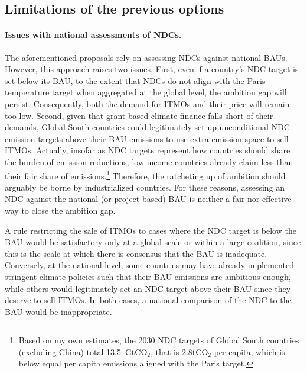 \documentclass[12pt,english]{article}
\begin{document}
\subsection{Limitations of the previous options\label{subsec:limitations}}

\paragraph{Issues with national assessments of NDCs.}
The aforementioned proposals %
rely on assessing NDCs against national BAUs. However, this approach raises two issues. 
First, even if a country's NDC target is set below its BAU, to the extent that NDCs do not align with the Paris temperature target when aggregated at the global level, the ambition gap will persist. %
Consequently, both the demand for ITMOs and their price will remain too low. Second, given that %
grant-based climate finance falls short of their demands, Global South countries could legitimately set up unconditional NDC emission targets above their BAU emissions to use extra emission space to sell ITMOs. Actually, insofar as NDC targets represent how countries should share the burden of emission reductions, low-income countries already claim less than their fair share of emissions.\footnote{Based on my own estimates, the 2030 NDC targets of Global South countries (excluding China) total 13.5~GtCO$_\text{2}$, that is 2.8tCO$_\text{2}$ per capita, which is below equal per capita emissions aligned with the Paris target.} %
Therefore, the ratcheting up of ambition should arguably be borne by industrialized countries. For these reasons, assessing an NDC against the national (or project-based) BAU is neither a fair nor effective way to close the ambition gap. %

A rule restricting the sale of ITMOs to cases where the NDC target is below the BAU would be satisfactory only at a global scale or within a large coalition, since this is the scale at which there is consensus that the BAU is inadequate.
Conversely, at the national level, some countries may have already implemented stringent climate policies %
such that their BAU emissions are ambitious enough, while others would legitimately set an NDC target above their BAU since they deserve to sell ITMOs. In both cases, a national comparison of the NDC to the BAU would be inappropriate. 
\end{document}

